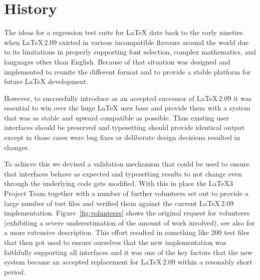 \documentclass[a4paper]{ltugboat}
\begin{document}
\section{History}

The ideas for a regression test suite for \LaTeX{} date back to the
early nineties when \LaTeX\,2.09 existed in various incompatible
flavours around the world due to its limitations in properly
supporting font selection, complex mathematics, and languages other
than English.  Because of that situation \LaTeXe{} was designed and
implemented to reunite the different format and to provide a stable
platform for future \LaTeX{} development.

However, to successfully introduce \LaTeXe{} as an accepted successor
of \LaTeX\,2.09 it was essential to win over the huge \LaTeX{} user
base and provide them with a system that was as stable and upward
compatible as possible. Thus existing user interfaces should be
preserved and typesetting should provide identical output except in
those cases were bug fixes or deliberate design decisions resulted in
changes.

To achieve this we devised a validation mechanism that could be used
to ensure that interfaces behave as expected and typesetting results
to not change even through the underlying code gets modified. With
this in place the \LaTeX3 Project Team together with a number of
further volunteers set out to provide a large number of test files and
verified them against the current \LaTeX\,2.09
implementation. Figure~\ref{fig:volunteers} shows the original request
for volunteers (exhibiting a severe underestimation of the amount of
work involved), see also \cite{tub???} for a more extensive
description. This effort resulted in something like 200 test files
that then got used to ensure ourselves that the new \LaTeXe{}
implementation was faithfully supporting all interfaces and it was one
of the key factors that the new system became an accepted replacement
for \LaTeX\,2.09 within a resonably short period.
\end{document}
